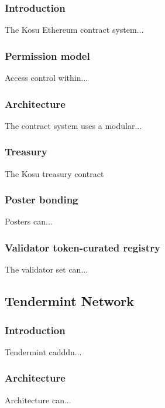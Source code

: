 \documentclass[10pt]{article}
\begin{document}
\subsubsection{Introduction}\label{ethereum-contract-system-intro}
The Kosu Ethereum contract system...

\subsubsection{Permission model}\label{ethereum-contract-system-auth}
Access control within...

\subsubsection{Architecture}\label{ethereum-contract-system-architecture}
The contract system uses a modular... 

\subsubsection{Treasury}\label{ethereum-contract-system-treasury}
The Kosu treasury contract

\subsubsection{Poster bonding}\label{ethereum-contract-system-poster-bonding}
Posters can...

\subsubsection{Validator token-curated registry}\label{ethereum-contract-system-tcr}
The validator set can...

\subsection{Tendermint Network}\label{tm-network}
\subsubsection{Introduction}\label{tm-network-intro}
Tendermint cadddn...

\subsubsection{Architecture}\label{tm-network-architecture}
Architecture can...
\end{document}
